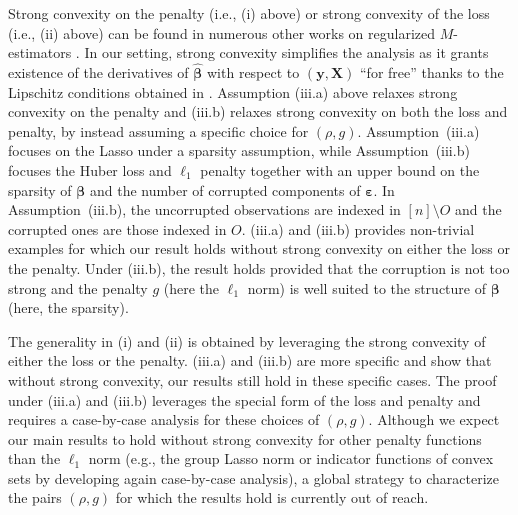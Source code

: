 \documentclass[11pt]{amsart}
\numberwithin{equation}{section}
\numberwithin{equation}{section}
\def\mathbold{\boldsymbol} %
\def\bX{\mathbold{X}}\def\hbX{{\widehat{\bX}}}\def\tbX{{\widetilde{\bX}}}\def\bXbar{{\overline \bX}}
\def\by{\mathbold{y}}\def\yhat{\widehat{y}}\def\ytil{\widetilde{y}}\def\ybar{{\overline y}}\def\vby{{\bf y}}
\def\bbeta{\mathbold{\beta}}\def\betahat{\widehat{\beta}}\def\hbeta{\widehat{\beta}}
\def\hbbeta{{{\widehat{\bbeta}}}}
\def\ep{\varepsilon}\def\eps{\epsilon}\def\veps{\varepsilon}
\def\bep{ {\mathbold{\ep} }}
\newcommand\pb[1]{{ #1 }}
\begin{document}
Strong convexity on the penalty (i.e., (i) above)
or strong convexity of the loss (i.e., (ii) above) can be found in numerous
other works on regularized $M$-estimators 
\cite[among others]{donoho2016high,celentano2019fundamental,xu2019consistent}.
In our setting, strong convexity simplifies the analysis
as it grants existence of the derivatives
of $\hbbeta$ with respect to $(\by,\bX)$ ``for free''
\pb{thanks to the Lipschitz conditions obtained in
\Cref{sec:lipschitz-properties}}.
Assumption (iii.a) above relaxes strong convexity on the penalty
and (iii.b) relaxes strong convexity on both the loss and penalty,
by instead assuming a specific choice for $(\rho,g)$.
Assumption~(iii.a) focuses on the Lasso under a sparsity assumption,
while Assumption~(iii.b) focuses
the Huber loss and $\ell_1$ penalty
together with an upper bound on the sparsity
of $\bbeta$ and the number of corrupted components
of $\bep$. In Assumption~(iii.b),
the uncorrupted observations are indexed
in $[n]\setminus O$ and
the corrupted ones are those indexed in $O$.
(iii.a) and (iii.b) provides non-trivial examples
for which our result holds
without strong convexity on either the loss or the penalty.
Under (iii.b), the result holds
provided that the corruption is not too strong
and the penalty $g$ (here the $\ell_1$ norm)
is well suited to the structure of $\bbeta$ (here, the sparsity).

The generality in (i) and (ii) is obtained
by leveraging the strong convexity of either the loss or the penalty.
(iii.a) and (iii.b) are more specific and
show that without strong convexity,
our results still hold in these specific cases.
The proof under (iii.a) and (iii.b) leverages
the special form of the loss and penalty and requires a case-by-case
analysis for these choices of $(\rho,g)$.
Although we expect our main results to hold without strong convexity
for other penalty functions than the $\ell_1$ norm (e.g., the group Lasso norm
or indicator functions of convex sets by developing again
case-by-case analysis), a global strategy
to characterize the pairs $(\rho,g)$ for which the results hold
is currently out of reach.
\end{document}
